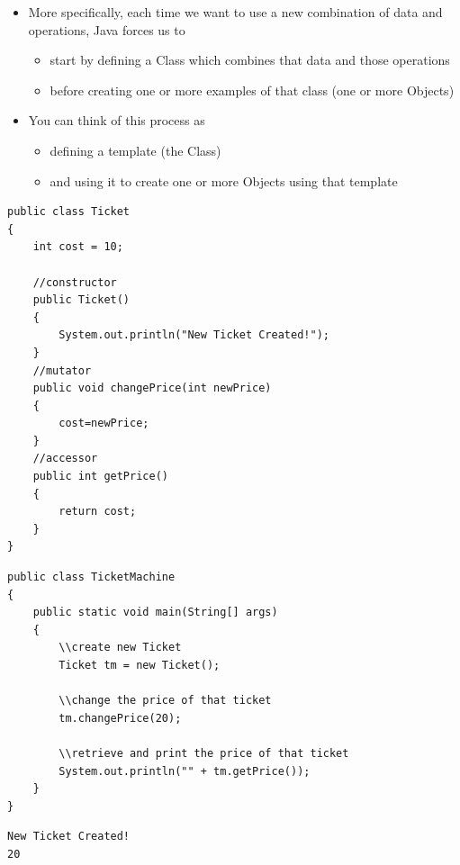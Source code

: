 \documentclass{beamer}
\begin{document}
\begin{frame}\begin{itemize}
\item More specifically, each time we want to use a new combination of data
and operations, Java forces us to 

\begin{itemize}
\item start by defining a Class which combines that data and those operations
\item before creating one or more examples of that class (one or more Objects)
\end{itemize}
\item You can think of this process as 

\begin{itemize}
\item defining a template (the Class)
\item and using it to create one or more Objects using that template
\end{itemize}
\end{itemize}\end{frame}

\begin{frame}[fragile]
\begin{block}{}
\tiny
\begin{lstlisting}
public class Ticket
{
    int cost = 10;
    
    //constructor
    public Ticket()
    {
        System.out.println("New Ticket Created!");
    } 
    //mutator
    public void changePrice(int newPrice)
    {
        cost=newPrice;
    } 
    //accessor
    public int getPrice()
    {
        return cost;
    }
}
\end{lstlisting}
\end{block}
\end{frame}

\begin{frame}[fragile]
\begin{block}{}
\begin{lstlisting}
public class TicketMachine
{
    public static void main(String[] args)
    {
    	\\create new Ticket
        Ticket tm = new Ticket();
        
        \\change the price of that ticket
        tm.changePrice(20);
        
        \\retrieve and print the price of that ticket
        System.out.println("" + tm.getPrice());
    }
}
\end{lstlisting}
\end{block}
\begin{block}{}
\begin{lstlisting}
New Ticket Created!
20
\end{lstlisting}
\end{block}
\end{frame}
\end{document}
